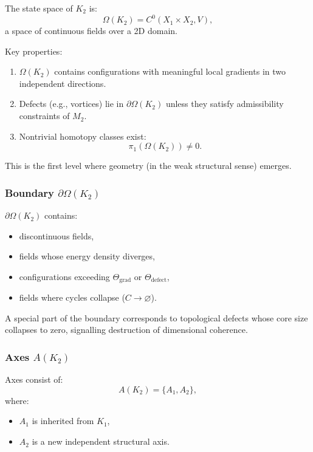 The state space of $K_2$ is:
\[
\Omega(K_2) = C^0(X_1 \times X_2, V),
\]
a space of continuous fields over a 2D domain.

Key properties:
\begin{enumerate}
    \item $\Omega(K_2)$ contains configurations with meaningful local
          gradients in two independent directions.
    \item Defects (e.g., vortices) lie in $\partial\Omega(K_2)$ unless
          they satisfy admissibility constraints of $M_2$.
    \item Nontrivial homotopy classes exist:
          \[
          \pi_1(\Omega(K_2)) \neq 0.
          \]
\end{enumerate}

This is the first level where geometry (in the weak structural sense)
emerges.

\subsubsection{Boundary \texorpdfstring{$\partial\Omega(K_2)$}{\partial\Omega(K_2)}}

$\partial\Omega(K_2)$ contains:
\begin{itemize}
    \item discontinuous fields,
    \item fields whose energy density diverges,
    \item configurations exceeding $\Theta_{\mathrm{grad}}$ or
          $\Theta_{\mathrm{defect}}$,
    \item fields where cycles collapse ($C \to \varnothing$).
\end{itemize}

A special part of the boundary corresponds to topological defects whose
core size collapses to zero, signalling destruction of dimensional
coherence.

\subsubsection{Axes \texorpdfstring{$A(K_2)$}{A(K_2)}}

Axes consist of:
\[
A(K_2) = \{A_1, A_2\},
\]
where:
\begin{itemize}
    \item $A_1$ is inherited from $K_1$,
    \item $A_2$ is a new independent structural axis.
\end{itemize}

